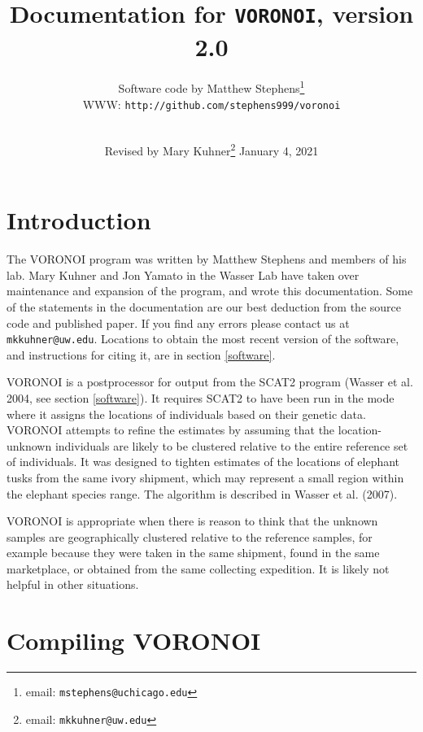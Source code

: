 \documentclass[10pt,titlepage,times,letterpaper]{article}
\begin{document}
\title{Documentation for {\tt VORONOI}, version 2.0}

\author{
Software code by Matthew Stephens\footnote{email: {\tt mstephens@uchicago.edu}} \\
WWW: {\tt http://github.com/stephens999/voronoi}\\
\\
}

\date{Revised by Mary Kuhner\footnote{email:  {\tt mkkuhner@uw.edu}} January 4, 2021}


\maketitle

\tableofcontents
\vfil\eject
\section{Introduction}
The VORONOI program was written by Matthew Stephens and members of his lab.  Mary Kuhner
and Jon Yamato in the Wasser Lab
have taken over maintenance and expansion of the program, and wrote this documentation.
Some of the statements in the documentation are our best deduction from the source code
and published paper.  If you find any errors please contact us at {\tt mkkuhner@uw.edu}.
Locations to obtain the most recent version of the software, and instructions for citing
it, are in section \ref{software}.

VORONOI is a postprocessor for output from the SCAT2 program (Wasser et al. 2004, see
section \ref{software}).
It requires SCAT2 to have been run in the mode where
it assigns the locations of individuals based on their genetic data.  VORONOI attempts
to refine the estimates by assuming that the location-unknown individuals are likely to
be clustered relative to the entire reference set of individuals.  It was designed to
tighten estimates of the locations of elephant tusks from the same ivory shipment, which
may represent a small region within the elephant species range.  The algorithm is
described in Wasser et al. (2007).

VORONOI is appropriate when there is reason to think that the unknown samples are
geographically clustered relative to the reference samples, for example
because they were taken in the same shipment, found in the same marketplace, or
obtained from the same collecting expedition.  It is likely not helpful in other
situations.


\section{Compiling VORONOI}
\end{document}
